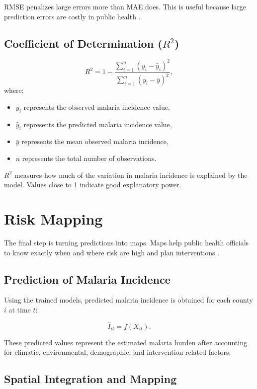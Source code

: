 RMSE penalizes large errors more than MAE does. This is useful because large prediction errors are costly in public health \cite{Ly2025Forecasting}.

\subsection{Coefficient of Determination (\(R^2\))}

\[
R^2 = 1 - \frac{\sum_{i=1}^{n} (y_i - \hat{y}_i)^2}{\sum_{i=1}^{n} (y_i - \bar{y})^2},
\]
where:
\begin{itemize}
	\item $y_i$ represents the observed malaria incidence value,
	\item $\hat{y}_i$ represents the predicted malaria incidence value,
	\item $\bar{y}$ represents the mean observed malaria incidence,
	\item $n$ represents the total number of observations.
\end{itemize}
\(R^2\) measures how much of the variation in malaria incidence is explained by the model. Values close to 1 indicate good explanatory power.

\section{Risk Mapping}
\label{sec:risk_mapping}



The final step is turning predictions into maps. Maps help public health officials  to know exactly when and where risk are high and plan interventions \cite{amek2012spatial}.
\subsection{Prediction of Malaria Incidence}

Using the trained models, predicted malaria incidence is obtained for each county $i$ at time $t$:

\[
\hat{I}_{it} = f(X_{it}).
\]

These predicted values represent the estimated malaria burden after accounting for climatic, environmental, demographic, and intervention-related factors.
\subsection{Spatial Integration and Mapping}
\label{sec:spatial_mapping}



